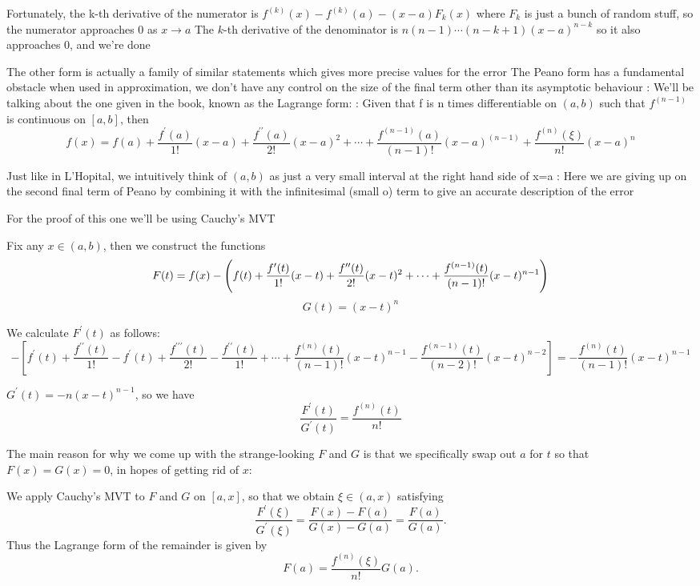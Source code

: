 Fortunately, the k-th derivative of the numerator is
$f^{(k)}(x)-f^{(k)}(a)-(x-a)F_k(x)$ where $F_k$ is just a bunch of random stuff, so the numerator approaches $0$ as $x\to a$
The $k$-th derivative of the denominator is $n(n-1)\cdots(n-k+1)(x-a)^{n-k}$ so it also approaches $0$, and we're done

The other form is actually a family of similar statements which gives more precise values for the error
The Peano form has a fundamental obstacle when used in approximation, we don't have any control on the size of the final term other than its asymptotic behaviour
:
We'll be talking about the one given in the book, known as the Lagrange form:
:
Given that f is n times differentiable on $(a,b)$ such that $f^{(n-1)}$ is continuous on $[a,b]$, then
\[ f(x)=f(a)+\frac{f^\prime(a)}{1!}(x-a)+\frac{f^{\prime\prime}(a)}{2!}(x-a)^2+\cdots+\frac{f^{(n-1)}(a)}{(n-1)!}(x-a)^(n-1)+\frac{f^{(n)}(\xi)}{n!}(x-a)^n \]

Just like in L'Hopital, we intuitively think of $(a,b)$ as just a very small interval at the right hand side of x=a
:
Here we are giving up on the second final term of Peano by combining it with the infinitesimal (small o) term to give an accurate description of the error

For the proof of this one we'll be using Cauchy's MVT

Fix any $x\in(a,b)$, then we construct the functions
\[ F(t)=f(x)-\left(f(t)+\frac{f^\prime(t)}{1!}(x-t)+\frac{f^{\prime\prime}(t)}{2!}(x-t)^2+\cdots+\frac{f^{(n-1)}(t)}{(n-1)!}(x-t)^{n-1}\right) \]
\[ G(t)=(x-t)^n \]

We calculate $F^\prime(t)$ as follows:
\[ -[f^\prime(t)+\frac{f^{\prime\prime}(t)}{1!}-f^\prime(t)+\frac{f^{\prime\prime\prime}(t)}{2!}-\frac{f^{\prime\prime}(t)}{1!}+\cdots+\frac{f^{(n)}(t)}{(n-1)!}(x-t)^{n-1}-\frac{f^{(n-1)}(t)}{(n-2)!}(x-t)^{n-2}]=-\frac{f^{(n)}(t)}{(n-1)!}(x-t)^{n-1} \]

$G^\prime(t)=-n(x-t)^{n-1}$, so we have
\[ \frac{F^\prime(t)}{G^\prime(t)}=\frac{f^{(n)}(t)}{n!} \]

The main reason for why we come up with the strange-looking $F$ and $G$ is that we specifically swap out $a$ for $t$ so that $F(x)=G(x)=0$, in hopes of getting rid of $x$:

We apply Cauchy's MVT to $F$ and $G$ on $[a,x]$, so that we obtain $\xi\in(a,x)$ satisfying
\[ \frac{F^\prime(\xi)}{G^\prime(\xi)}=\frac{F(x)-F(a)}{G(x)-G(a)}=\frac{F(a)}{G(a)}. \]
Thus the Lagrange form of the remainder is given by 
\[ F(a)=\frac{f^{(n)}(\xi)}{n!}G(a). \]

